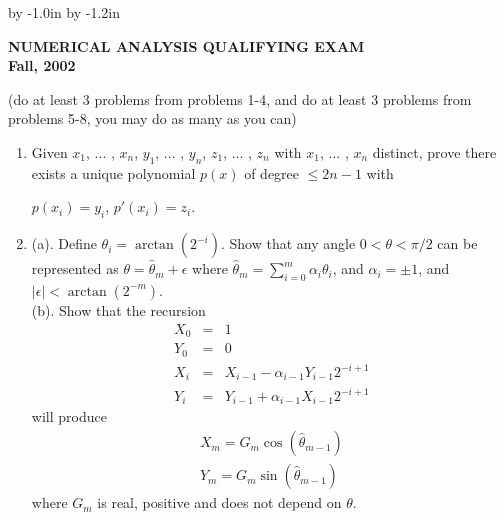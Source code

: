 
\def\hcorrection#1{\advance\hoffset by #1 }
\def\vcorrection#1{\advance\voffset by #1 }
 
 
\vcorrection{-1.0in}
\hcorrection{-1.2in}
\textwidth 7.0in
\textheight 9.0in
 

 
\begin{large}
 
\begin{center}
    \begin{Large}
        {\bf NUMERICAL ANALYSIS QUALIFYING EXAM \\
            Fall, 2002}\\
    \end{Large}
\end{center}
 
\vspace{.1in}
 
 

(do at least 3 problems from problems 1-4, and do at least
3 problems from problems 5-8, you may do as many as you can)  \\


 \begin{enumerate}
\item Given $x_1$, ... , $x_n$, $y_1$, ... , $y_n$,  $z_1$, ... , $z_n$
with $x_1$, ... , $x_n$ distinct, prove there exists a unique polynomial
$p(x)$ of degree $ \leq  2n-1 $ with \\
\begin{center} $p(x_i)=y_i$, $p'(x_i)=z_i$. \end{center}

\item 
   (a). Define $\theta_i=\arctan(2^{-i})$. Show that any angle $0 < \theta
< \pi/2$ can be represented as $\theta=\widehat{\theta}_m+\epsilon$ where
$\widehat{\theta}_m = \sum_{i=0}^m \alpha_i \theta_i$, and $\alpha_i=\pm 1$, 
and $|\epsilon| < \arctan(2^{-m})$. \\

   (b). Show that the recursion
\begin{eqnarray*}
X_0 & = & 1 \\
Y_0 & = & 0 \\
X_i & = & X_{i-1} - \alpha_{i-1}Y_{i-1}2^{-i+1} \\
Y_i & = & Y_{i-1} + \alpha_{i-1}X_{i-1}2^{-i+1}
\end{eqnarray*}
will produce
$$ \begin{array}{l} X_m=G_m\cos(\widehat{\theta}_{m-1})\\
Y_m=G_m\sin(\widehat{\theta}_{m-1}) \end{array}$$
where $G_m$ is real, positive and does not depend on $\theta$.


\end{enumerate}
\end{large}
